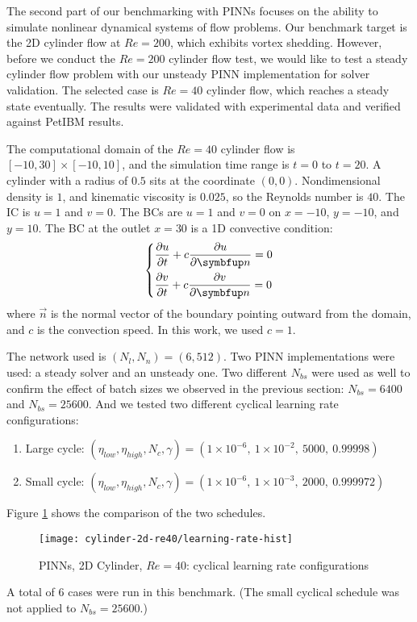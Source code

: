 The second part of our benchmarking with PINNs focuses on the ability to simulate nonlinear dynamical systems of flow problems.
Our benchmark target is the 2D cylinder flow at $Re=200$, which exhibits vortex shedding.
However, before we conduct the $Re=200$ cylinder flow test, we would like to test a steady cylinder flow problem with our unsteady PINN implementation for solver validation.
The selected case is $Re=40$ cylinder flow, which reaches a steady state eventually.
The results were validated with experimental data and verified against PetIBM results.

The computational domain of the $Re=40$ cylinder flow is $[-10, 30]\times[-10, 10]$, and the simulation time range is $t=0$ to $t=20$.
A cylinder with a radius of $0.5$ sits at the coordinate $(0, 0)$.
Nondimensional density is $1$, and kinematic viscosity is $0.025$, so the Reynolds number is $40$.
The IC is $u=1$ and $v=0$.
The BCs are $u=1$ and $v=0$ on $x=-10$, $y=-10$, and $y=10$.
The BC at the outlet $x=30$ is a 1D convective condition:
\begin{equation}\label{eq:convec-bc}
    \left\{
    \begin{aligned}
        &\pdiff{u}{t} + c\pdiff{u}{\vec{n}} = 0 \\
        &\pdiff{v}{t} + c\pdiff{v}{\vec{n}} = 0 \\
    \end{aligned}
    \right.
\end{equation}
where $\vec{n}$ is the normal vector of the boundary pointing outward from the domain, and $c$ is the convection speed.
In this work, we used $c=1$.

The network used is $(N_l, N_n)=(6, 512)$.
Two PINN implementations were used: a steady solver and an unsteady one.
Two different $N_{bs}$ were used as well to confirm the effect of batch sizes we observed in the previous section: $N_{bs}=\num{6400}$ and $N_{bs}=\num{25600}$.
And we tested two different cyclical learning rate configurations:
\begin{enumerate}[nolistsep]
    \item Large cycle: $(\eta_{low}, \eta_{high}, N_c, \gamma)=(1\times 10^{-6},\ 1\times 10^{-2},\ 5000,\ 0.99998)$
    \item Small cycle: $(\eta_{low}, \eta_{high}, N_c, \gamma)=(1\times 10^{-6},\ 1\times 10^{-3},\ 2000,\ 0.999972)$
\end{enumerate}
Figure \ref{fig:cylinder-2d-re40-lr-hist} shows the comparison of the two schedules.
\begin{figure}[hbt!]
    \texttt{[image: cylinder-2d-re40/learning-rate-hist]}
    \caption[%
        PINNs, 2D Cylinder, $Re=40$: cyclical learning rate configurations%
    ]{%
        PINNs, 2D Cylinder, $Re=40$: cyclical learning rate configurations%
    }%
    \label{fig:cylinder-2d-re40-lr-hist}
\end{figure}
A total of 6 cases were run in this benchmark.
(The small cyclical schedule was not applied to $N_{bs}=\num{25600}$.)

